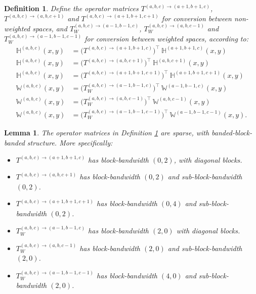 \documentclass[11pt, oneside]{article}   	%
\newcommand{\hdop}{H}
\newcommand{\bighdop}{\mathbb{\hdop}}
\newcommand{\bigW}{\mathbb{W}}
\newtheorem{lemma}{Lemma}
\newtheorem{definition}{Definition}
\begin{document}
\begin{definition}\label{def:parametertransformationoperators}
Define the operator matrices $T^{(a,b,c)\to(a+1,b+1,c)}$, $T^{(a,b,c)\to(a,b,c+1)}$ and $T^{(a,b,c)\to(a+1,b+1,c+1)}$ for conversion between non-weighted spaces, and $T_W^{(a,b,c)\to(a-1,b-1,c)}$, $T_W^{(a,b,c)\to(a,b,c-1)}$ and $T_W^{(a,b,c)\to(a-1,b-1,c-1)}$ for conversion between weighted spaces, according to:
\begin{align*}
	\bighdop^{(a,b,c)}(x,y) &= \Big(T^{(a,b,c)\to(a+1,b+1,c)} \Big)^\top \: \bighdop^{(a+1,b+1,c)}(x,y) \\
	\bighdop^{(a,b,c)}(x,y) &= \Big(T^{(a,b,c)\to(a,b,c+1)} \Big)^\top \: \bighdop^{(a,b,c+1)}(x,y) \\
	\bighdop^{(a,b,c)}(x,y) &= \Big(T^{(a,b,c)\to(a+1,b+1,c+1)} \Big)^\top \: \bighdop^{(a+1,b+1,c+1)}(x,y) \\
	\bigW^{(a,b,c)}(x,y) &= \Big(T_W^{(a,b,c)\to(a-1,b-1,c)} \Big)^\top \: \bigW^{(a-1,b-1,c)}(x,y) \\
	\bigW^{(a,b,c)}(x,y) &= \Big(T_W^{(a,b,c)\to(a,b,c-1)} \Big)^\top \: \bigW^{(a,b,c-1)}(x,y) \\
	\bigW^{(a,b,c)}(x,y) &= \Big(T_W^{(a,b,c)\to(a-1,b-1,c-1)} \Big)^\top \: \bigW^{(a-1,b-1,c-1)}(x,y).
\end{align*}
\end{definition}

\begin{lemma}\label{lemma:sparsityofparametertransformationoperators}
The operator matrices in Definition \ref{def:parametertransformationoperators} are sparse, with banded-block-banded structure. More specifically:
\begin{itemize}
	\item $T^{(a,b,c)\to(a+1,b+1,c)}$ has block-bandwidth $(0,2)$, with diagonal blocks.
  	\item $T^{(a,b,c)\to(a,b,c+1)}$ has block-bandwidth $(0,2)$ and sub-block-bandwidth $(0,2)$.
	\item $T^{(a,b,c)\to(a+1,b+1,c+1)}$ has block-bandwidth $(0,4)$ and sub-block-bandwidth $(0,2)$.
	\item $T_W^{(a,b,c)\to(a-1,b-1,c)}$ has block-bandwidth $(2,0)$ with diagonal blocks.
  	\item $T_W^{(a,b,c)\to(a,b,c-1)}$ has block-bandwidth $(2,0)$ and sub-block-bandwidth $(2,0)$.
	\item $T_W^{(a,b,c)\to(a-1,b-1,c-1)}$ has block-bandwidth $(4,0)$ and sub-block-bandwidth $(2,0)$.
\end{itemize}
\end{lemma}
\end{document}
